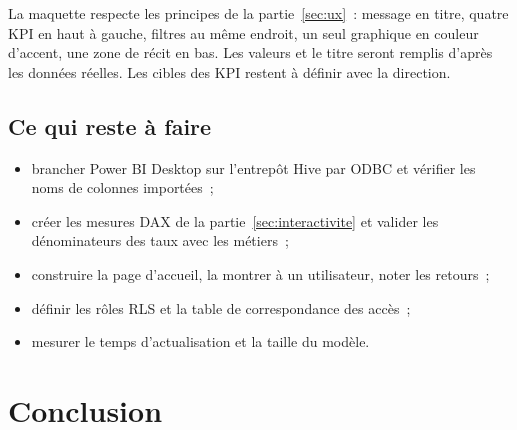 \begin{center}
\end{center}

\noindent La maquette respecte les principes de la partie~\ref{sec:ux}~: message en titre, quatre KPI en haut à gauche, filtres au même endroit, un seul graphique en couleur d'accent, une zone de récit en bas. Les valeurs et le titre seront remplis d'après les données réelles. Les cibles des KPI restent à définir avec la direction.

\subsection{Ce qui reste à faire}

\begin{itemize}
	\item brancher Power BI Desktop sur l'entrepôt Hive par ODBC et vérifier les noms de colonnes importées~;
	\item créer les mesures DAX de la partie~\ref{sec:interactivite} et valider les dénominateurs des taux avec les métiers~;
	\item construire la page d'accueil, la montrer à un utilisateur, noter les retours~;
	\item définir les rôles RLS et la table de correspondance des accès~;
	\item mesurer le temps d'actualisation et la taille du modèle.
\end{itemize}

\section*{Conclusion}
{}

